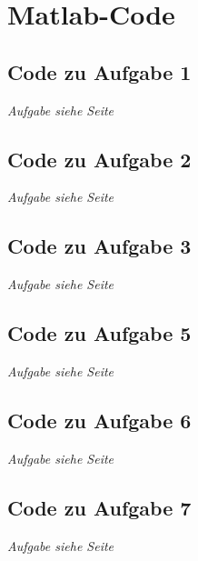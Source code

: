 \documentclass[./Protokollheft.tex]{subfiles}
\begin{document}
\newpage
\newpage

\section{Matlab-Code}
\label{appendix}

\subsection{Code zu Aufgabe 1}
\label{code4.1}
\textit{ Aufgabe siehe Seite \pageref{v4.PA.1} }


\subsection{Code zu Aufgabe 2}
\label{code4.2}
\textit{Aufgabe siehe Seite \pageref{v4.PA.2} }


\subsection{Code zu Aufgabe 3}
\label{code4.3}
\textit{Aufgabe siehe Seite \pageref{v4.PA.3}}



\subsection{Code zu Aufgabe 5}
\label{code4.5}
\textit{Aufgabe siehe Seite \pageref{v4.PA.5}}


\subsection{Code zu Aufgabe 6}
\label{code4.6}
\textit{Aufgabe siehe Seite \pageref{v4.PA.6}}


\subsection{Code zu Aufgabe 7}
\label{code4.7}
\textit{Aufgabe siehe Seite \pageref{v4.PA.7}}

\end{document}
